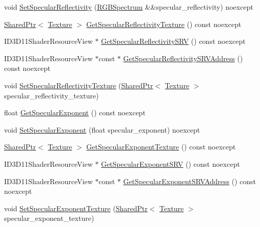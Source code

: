 \begin{DoxyCompactItemize}
\item 
void \hyperlink{structmage_1_1_material_ade7fe7386618bd139e9c43699eba0a20}{Set\+Specular\+Reflectivity} (\hyperlink{structmage_1_1_r_g_b_spectrum}{R\+G\+B\+Spectrum} \&\&specular\+\_\+reflectivity) noexcept
\item 
\hyperlink{namespacemage_a1e01ae66713838a7a67d30e44c67703e}{Shared\+Ptr}$<$ \hyperlink{classmage_1_1_texture}{Texture} $>$ \hyperlink{structmage_1_1_material_a7ed5469af2440a4fc1db498c24f06764}{Get\+Specular\+Reflectivity\+Texture} () const noexcept
\item 
I\+D3\+D11\+Shader\+Resource\+View $\ast$ \hyperlink{structmage_1_1_material_a04fad2f985ed5078a8217ebcfd51c3f0}{Get\+Specular\+Reflectivity\+S\+RV} () const noexcept
\item 
I\+D3\+D11\+Shader\+Resource\+View $\ast$const  $\ast$ \hyperlink{structmage_1_1_material_a7c3ea6461982e7dc9a60a391d601f172}{Get\+Specular\+Reflectivity\+S\+R\+V\+Address} () const noexcept
\item 
void \hyperlink{structmage_1_1_material_a130430244dfd0b5866b00fca523e874c}{Set\+Specular\+Reflectivity\+Texture} (\hyperlink{namespacemage_a1e01ae66713838a7a67d30e44c67703e}{Shared\+Ptr}$<$ \hyperlink{classmage_1_1_texture}{Texture} $>$ specular\+\_\+reflectivity\+\_\+texture)
\item 
float \hyperlink{structmage_1_1_material_a48afb440024e4e2e45a81ce2b46c0d73}{Get\+Specular\+Exponent} () const noexcept
\item 
void \hyperlink{structmage_1_1_material_a078a2c9388993523e29f287e20385b3f}{Set\+Specular\+Exponent} (float specular\+\_\+exponent) noexcept
\item 
\hyperlink{namespacemage_a1e01ae66713838a7a67d30e44c67703e}{Shared\+Ptr}$<$ \hyperlink{classmage_1_1_texture}{Texture} $>$ \hyperlink{structmage_1_1_material_a24c476c257c3ba042ddda666c26660c0}{Get\+Specular\+Exponent\+Texture} () const noexcept
\item 
I\+D3\+D11\+Shader\+Resource\+View $\ast$ \hyperlink{structmage_1_1_material_aca8740404b0e52c781dd1c02ec167539}{Get\+Specular\+Exponent\+S\+RV} () const noexcept
\item 
I\+D3\+D11\+Shader\+Resource\+View $\ast$const  $\ast$ \hyperlink{structmage_1_1_material_a57a083f7769c5d6501282d66b6733b10}{Get\+Specular\+Exponent\+S\+R\+V\+Address} () const noexcept
\item 
void \hyperlink{structmage_1_1_material_ae07cb5f8c3b4ee0d6e6f4f91c1cbbf35}{Set\+Specular\+Exponent\+Texture} (\hyperlink{namespacemage_a1e01ae66713838a7a67d30e44c67703e}{Shared\+Ptr}$<$ \hyperlink{classmage_1_1_texture}{Texture} $>$ specular\+\_\+exponent\+\_\+texture)

\end{DoxyCompactItemize}
